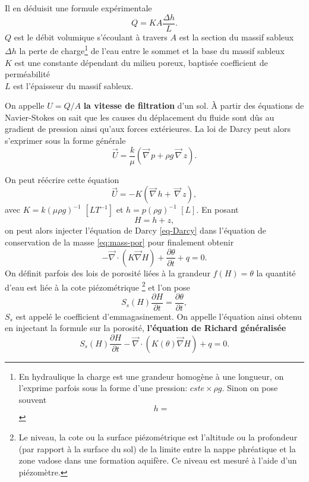 \documentclass[a4paper,11pt]{article}
\numberwithin{equation}{section}
\begin{document}
Il en déduisit une formule expérimentale
\begin{equation}
	\label{eq:Darcy}
	Q=KA\frac{\Delta h}{L}.
\end{equation}
$Q$ est le débit volumique s'écoulant à travers  
$A$ est la section du massif sableux\\
$\Delta h$ la perte de charge\footnote{En hydraulique la charge est une grandeur homogène à une longueur, on l'exprime parfois sous la forme d'une pression: $cste\times\rho g$. Sinon on pose souvent \[h=\]} de l'eau entre le sommet et la base du massif sableux\\
$K$ est une constante dépendant du milieu poreux, baptisée coefficient de perméabilité\\
$L$ est l'épaisseur du massif sableux.



\vspace{0.7cm}

On appelle $U=Q/A$ \textbf{la vitesse de filtration} d'un sol. À partir des équations de Navier-Stokes on sait que les causes du déplacement du fluide sont dûs au gradient de pression ainsi qu'aux forces extérieures. La loi de Darcy peut alors s'exprimer sous la forme générale
\begin{equation}
	\label{eq-Darcy}
	\overrightarrow{U}=\frac{k}{\mu }(\overrightarrow{\nabla}\, p+\rho g \,\overrightarrow{\nabla}\, z).
\end{equation} 

On peut réécrire cette équation
\[\overrightarrow{U}=-K(\overrightarrow{\nabla}\, h + \,\overrightarrow{\nabla}\, z),\]
avec $K=k(\mu \rho g)^{-1}$ $[LT^{-1}]$ et $h=p(\rho g)^{-1}$ $[L]$. En posant 
\[H=h+z,\]
on peut alors injecter l'équation de Darcy \eqref{eq-Darcy} dans l'équation de conservation de la masse \eqref{eq:mass-por} pour finalement obtenir
\begin{equation}
	\label{eq-Richards}
 	-\overrightarrow{\nabla} \cdot (K\overrightarrow{\nabla}H)+\frac{\partial\theta}{\partial t}+ q=0.
\end{equation}  
On définit parfois des lois de porosité liées à la grandeur $f(H)=\theta$ la quantité d'eau est liée à la cote piézométrique \footnote{Le niveau, la cote ou la surface piézométrique est l'altitude ou la profondeur (par rapport à la surface du sol) de la limite entre la nappe phréatique et la zone vadose dans une formation aquifère. Ce niveau est mesuré à l'aide d'un piézomètre.} et l'on pose 
\[S_s(H)\frac{\partial H}{\partial t}=\frac{\partial\theta}{\partial t},\]
$S_s$ est appelé le coefficient d'emmagasinement. On appelle l'équation ainsi obtenu en injectant la formule sur la porosité, \textbf{l'équation de Richard généralisée}
\begin{equation}
	\label{eq-ge-richard}
	S_s(H)\frac{\partial H}{\partial t}-\overrightarrow{\nabla} \cdot (K(\theta)\overrightarrow{\nabla}H)+q=0.
\end{equation}
\end{document}
